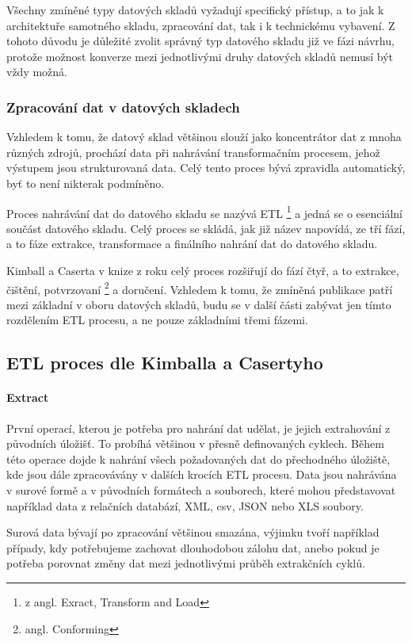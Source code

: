 \documentclass[
  digital,     %
  twoside,     %
  lof,         %
  lot,         %
]{fithesis4}
\begin{document}
Všechny zmíněné typy datových skladů vyžadují specifický přístup, a to jak
k architektuře samotného skladu, zpracování dat, tak i k technickému vybavení. Z tohoto
důvodu je důležité zvolit správný typ datového skladu již ve fázi návrhu, protože
možnost konverze mezi jednotlivými druhy datových skladů nemusí být vždy možná.

\subsubsection{Zpracování dat v datových skladech}
Vzhledem k tomu, že datový sklad většinou slouží jako koncentrátor dat z mnoha různých zdrojů, prochází data při nahrávání transformačním procesem, jehož výstupem jsou strukturovaná data. Celý tento proces bývá zpravidla automatický, byť to není nikterak podmíněno.

Proces nahrávání dat do datového skladu se nazývá ETL \footnote{z angl. Exract, Transform and Load} a jedná se o esenciální součást datového skladu. Celý proces se skládá, jak již název napovídá, ze tří fází, a to fáze extrakce, transformace a finálního nahrání dat do datového skladu.

Kimball a Caserta v knize  z roku \citeyear{Kimballc2004} celý proces rozšiřují do fází čtyř, a to extrakce, čištění, potvrzovaní \footnote{angl. Conforming} a doručení. Vzhledem k tomu, že zmíněná publikace patří mezi základní v oboru datových skladů, budu se v další části zabývat jen tímto rozdělením ETL
procesu, a ne pouze základními třemi fázemi.

\subsection{ETL proces dle Kimballa a Casertyho}
\paragraph{Extract}
První operací, kterou je potřeba pro nahrání dat udělat, je jejich extrahování z původních úložišť. To probíhá většinou v přesně definovaných cyklech. Během této operace dojde k nahrání všech požadovaných dat do přechodného úložiště, kde jsou dále zpracovávány v dalších krocích ETL procesu. Data jsou nahrávána v surové formě a v původních formátech a souborech, které mohou představovat například data z relačních databází, XML, csv, JSON nebo XLS soubory.\parencite[s.~18]{Kimballc2004}

Surová data bývají po zpracování většinou smazána, výjimku tvoří například případy, kdy potřebujeme zachovat dlouhodobou zálohu dat, anebo pokud je potřeba porovnat změny dat mezi jednotlivými průběh extrakčních cyklů.\parencite[s.~18]{Kimballc2004}
\end{document}

